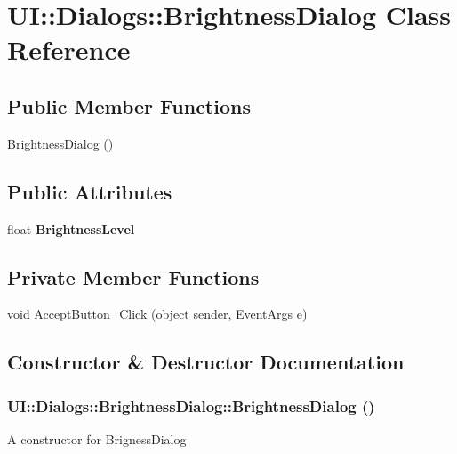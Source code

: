\hypertarget{class_u_i_1_1_dialogs_1_1_brightness_dialog}{
\section{UI::Dialogs::BrightnessDialog Class Reference}
\label{class_u_i_1_1_dialogs_1_1_brightness_dialog}
}
\subsection*{Public Member Functions}
\begin{DoxyCompactItemize}
\item 
\hyperlink{class_u_i_1_1_dialogs_1_1_brightness_dialog_a1d76ea754eeee6083a1b13e1c468b4d4}{BrightnessDialog} ()
\end{DoxyCompactItemize}
\subsection*{Public Attributes}
\begin{DoxyCompactItemize}
\item 
\hypertarget{class_u_i_1_1_dialogs_1_1_brightness_dialog_a70b6bd43eb4bc3c29a67629cc8918c61}{
float {\bfseries BrightnessLevel}}
\label{class_u_i_1_1_dialogs_1_1_brightness_dialog_a70b6bd43eb4bc3c29a67629cc8918c61}

\end{DoxyCompactItemize}
\subsection*{Private Member Functions}
\begin{DoxyCompactItemize}
\item 
void \hyperlink{class_u_i_1_1_dialogs_1_1_brightness_dialog_a62c4999f69f1f50776ee4a674c73ed95}{AcceptButton\_\-Click} (object sender, EventArgs e)
\end{DoxyCompactItemize}


\subsection{Constructor \& Destructor Documentation}
\hypertarget{class_u_i_1_1_dialogs_1_1_brightness_dialog_a1d76ea754eeee6083a1b13e1c468b4d4}{
\subsubsection[{BrightnessDialog}]{\setlength{\rightskip}{0pt plus 5cm}UI::Dialogs::BrightnessDialog::BrightnessDialog ()}}
\label{class_u_i_1_1_dialogs_1_1_brightness_dialog_a1d76ea754eeee6083a1b13e1c468b4d4}
A constructor for BrignessDialog 

